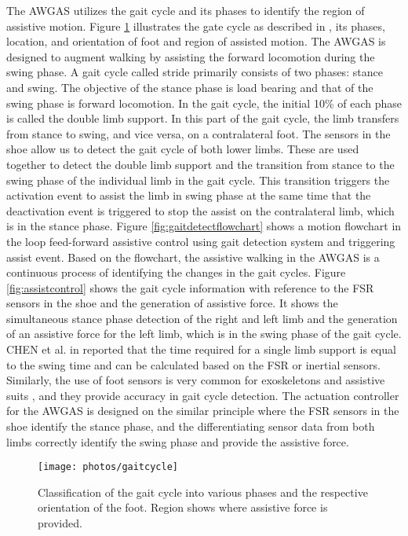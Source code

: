\documentclass[paper,JRM,paper]{jaciiiarticle}
\begin{document}
The AWGAS utilizes the gait cycle and its phases to identify the region of assistive motion. Figure \ref{fig:gaitcycle} illustrates the gate cycle as described in \cite{12}, its phases, location, and orientation of foot and region of assisted motion. The AWGAS is designed to augment walking by assisting the forward locomotion during the swing phase. A gait cycle called stride primarily consists of two phases: stance and swing. The objective of the stance phase is load bearing and that of the swing phase is forward locomotion. In the gait cycle, the initial 10\% of each phase is called the double limb support. In this part of the gait cycle, the limb transfers from stance to swing, and vice versa, on a contralateral foot. The sensors in the shoe allow us to detect the gait cycle of both lower limbs. These are used together to detect the double limb support and the transition from stance to the swing phase of the individual limb in the gait cycle. This transition triggers the activation event to assist the limb in swing phase at the same time that the deactivation event is triggered to stop the assist on the contralateral limb, which is in the stance phase. Figure \ref{fig:gaitdetectflowchart} shows a motion flowchart in the loop feed-forward assistive control using gait detection system and triggering assist event. Based on the flowchart, the assistive walking in the AWGAS is a continuous process of identifying the changes in the gait cycles. Figure \ref{fig:assistcontrol} shows the gait cycle information with reference to the FSR sensors in the shoe and the generation of assistive force. It shows the simultaneous stance phase detection of the right and left limb and the generation of an assistive force for the left limb, which is in the swing phase of the gait cycle. CHEN  et al. in \cite{13} reported that the time required for a single limb support is equal to the swing time and can be calculated based on the FSR or inertial sensors. Similarly, the use of foot sensors is very common for exoskeletons and assistive suits \cite{14,15,16,17,18,19,20,21}, and they provide accuracy in gait cycle detection. The actuation controller for the AWGAS is designed on the similar principle where the FSR sensors in the shoe identify the stance phase, and the differentiating sensor data from both limbs correctly identify the swing phase and provide the assistive force.

\begin{figure}[h]
	\centering
	\texttt{[image: photos/gaitcycle]}
	\caption{Classification of the gait cycle into various phases and the respective orientation of the foot. Region shows where assistive force is provided.}
	\label{fig:gaitcycle}
\end{figure}
\end{document}
